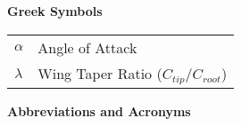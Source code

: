 \hspace{-0.5in}\textbf{Greek Symbols}
{\renewcommand\arraystretch{1.0}
\noindent\begin{longtable*}{@{}l @{\quad=\quad} l@{}}
    $\alpha$ & Angle of Attack \\
    $\lambda$ & Wing Taper Ratio ($C_{tip} / C_{root}$) \\
\end{longtable*}}
\hspace{-0.5in}\textbf{Abbreviations and Acronyms}
